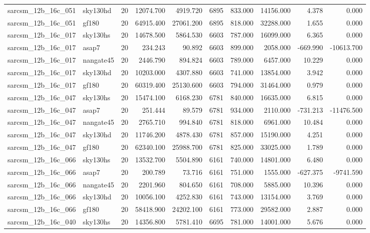 \begin{tabular}{llrrrrrrrr}
sarcsm\_12b\_16c\_051 & sky130hd & 20 & 12074.700 & 4919.720 & 6895 & 833.000 & 14156.000 & 4.378 & 0.000 \\
sarcsm\_12b\_16c\_051 & gf180 & 20 & 64915.400 & 27061.200 & 6895 & 818.000 & 32288.000 & 1.655 & 0.000 \\
sarcsm\_12b\_16c\_017 & sky130hs & 20 & 14678.500 & 5864.530 & 6603 & 787.000 & 16099.000 & 6.365 & 0.000 \\
sarcsm\_12b\_16c\_017 & asap7 & 20 & 234.243 & 90.892 & 6603 & 899.000 & 2058.000 & -669.990 & -10613.700 \\
sarcsm\_12b\_16c\_017 & nangate45 & 20 & 2446.790 & 894.824 & 6603 & 789.000 & 6457.000 & 10.229 & 0.000 \\
sarcsm\_12b\_16c\_017 & sky130hd & 20 & 10203.000 & 4307.880 & 6603 & 741.000 & 13854.000 & 3.942 & 0.000 \\
sarcsm\_12b\_16c\_017 & gf180 & 20 & 60319.400 & 25130.600 & 6603 & 794.000 & 31464.000 & 0.979 & 0.000 \\
sarcsm\_12b\_16c\_047 & sky130hs & 20 & 15474.100 & 6168.230 & 6781 & 840.000 & 16635.000 & 6.815 & 0.000 \\
sarcsm\_12b\_16c\_047 & asap7 & 20 & 251.444 & 89.579 & 6781 & 934.000 & 2110.000 & -731.213 & -11476.500 \\
sarcsm\_12b\_16c\_047 & nangate45 & 20 & 2765.710 & 994.840 & 6781 & 818.000 & 6961.000 & 10.484 & 0.000 \\
sarcsm\_12b\_16c\_047 & sky130hd & 20 & 11746.200 & 4878.430 & 6781 & 857.000 & 15190.000 & 4.251 & 0.000 \\
sarcsm\_12b\_16c\_047 & gf180 & 20 & 62340.100 & 25988.700 & 6781 & 825.000 & 33025.000 & 1.789 & 0.000 \\
sarcsm\_12b\_16c\_066 & sky130hs & 20 & 13532.700 & 5504.890 & 6161 & 740.000 & 14801.000 & 6.480 & 0.000 \\
sarcsm\_12b\_16c\_066 & asap7 & 20 & 200.789 & 73.716 & 6161 & 751.000 & 1555.000 & -627.375 & -9741.590 \\
sarcsm\_12b\_16c\_066 & nangate45 & 20 & 2201.960 & 804.650 & 6161 & 708.000 & 5885.000 & 10.396 & 0.000 \\
sarcsm\_12b\_16c\_066 & sky130hd & 20 & 10056.100 & 4252.830 & 6161 & 743.000 & 13154.000 & 3.769 & 0.000 \\
sarcsm\_12b\_16c\_066 & gf180 & 20 & 58418.900 & 24202.100 & 6161 & 773.000 & 29582.000 & 2.887 & 0.000 \\
sarcsm\_12b\_16c\_040 & sky130hs & 20 & 14356.800 & 5781.410 & 6695 & 781.000 & 14001.000 & 5.676 & 0.000 \\

\end{tabular}
